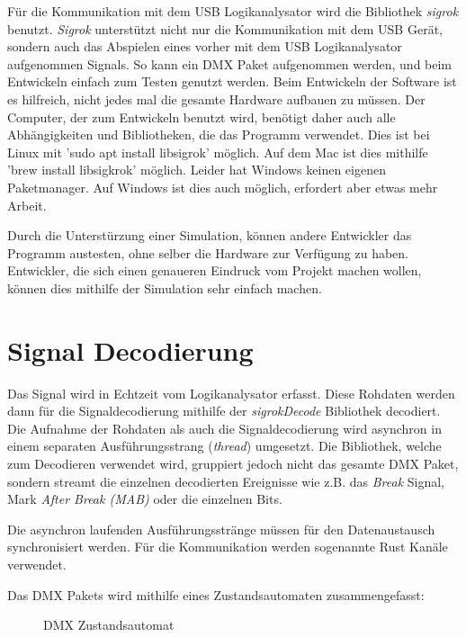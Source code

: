 Für die Kommunikation mit dem USB Logikanalysator wird die Bibliothek \emph{sigrok} benutzt. \emph{Sigrok} unterstützt nicht nur die Kommunikation mit dem USB Gerät, sondern auch das Abspielen eines vorher  mit dem USB Logikanalysator aufgenommen Signals. So kann ein DMX Paket aufgenommen werden, und beim Entwickeln einfach zum Testen genutzt werden. Beim Entwickeln der Software ist es hilfreich, nicht jedes mal die gesamte Hardware aufbauen zu müssen. Der Computer, der zum Entwickeln benutzt wird, benötigt daher auch alle Abhängigkeiten und Bibliotheken, die das Programm verwendet. Dies ist bei Linux mit 'sudo apt install libsigrok' möglich. Auf dem Mac ist dies mithilfe 'brew install libsigkrok' möglich. Leider hat Windows keinen eigenen Paketmanager. Auf Windows ist dies auch möglich, erfordert aber etwas mehr Arbeit.

Durch die Unterstürzung einer Simulation, können andere Entwickler das Programm austesten, ohne selber die Hardware zur Verfügung zu haben. Entwickler, die sich einen genaueren Eindruck vom Projekt machen wollen, können dies mithilfe der Simulation sehr einfach machen.


\section{Signal Decodierung}


Das Signal wird in Echtzeit vom Logikanalysator erfasst. Diese Rohdaten werden dann für die Signaldecodierung mithilfe der \emph{sigrokDecode} Bibliothek decodiert. Die Aufnahme der Rohdaten als auch die Signaldecodierung wird asynchron in einem separaten Ausführungsstrang (\emph{thread}) umgesetzt. Die Bibliothek, welche zum Decodieren verwendet wird, gruppiert jedoch nicht das gesamte DMX Paket, sondern streamt die einzelnen decodierten Ereignisse wie z.B. das \emph{Break} Signal, Mark \emph{After Break (MAB)} oder die einzelnen Bits.

Die asynchron laufenden Ausführungsstränge müssen für den Datenaustausch synchronisiert werden. Für die Kommunikation werden sogenannte Rust Kanäle verwendet.

Das DMX Pakets wird mithilfe eines Zustandsautomaten zusammengefasst:

\begin{figure}[H]
	\centering
	\caption{DMX Zustandsautomat}
	\label{fig:my_label}
\end{figure}

